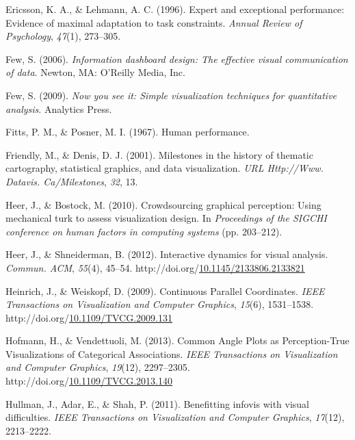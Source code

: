 \documentclass[print]{nuthesis}
\newlength{\cslhangindent}
\newenvironment{CSLReferences}[2]%
{\setlength{\parindent}{0pt}%
\everypar{\setlength{\hangindent}{\cslhangindent}}\ignorespaces}%
{\par}
\begin{document}
\begin{CSLReferences}{1}{0}
\leavevmode{}%
Ericsson, K. A., \& Lehmann, A. C. (1996). Expert and exceptional performance: Evidence of maximal adaptation to task constraints. \emph{Annual Review of Psychology}, \emph{47}(1), 273--305.

\leavevmode{}%
Few, S. (2006). \emph{Information dashboard design: The effective visual communication of data}. Newton, MA: O'Reilly Media, Inc.

\leavevmode{}%
Few, S. (2009). \emph{Now you see it: Simple visualization techniques for quantitative analysis}. Analytics Press.

\leavevmode{}%
Fitts, P. M., \& Posner, M. I. (1967). Human performance.

\leavevmode{}%
Friendly, M., \& Denis, D. J. (2001). Milestones in the history of thematic cartography, statistical graphics, and data visualization. \emph{URL Http://Www. Datavis. Ca/Milestones}, \emph{32}, 13.

\leavevmode{}%
Heer, J., \& Bostock, M. (2010). Crowdsourcing graphical perception: Using mechanical turk to assess visualization design. In \emph{Proceedings of the SIGCHI conference on human factors in computing systems} (pp. 203--212).

\leavevmode{}%
Heer, J., \& Shneiderman, B. (2012). Interactive dynamics for visual analysis. \emph{Commun. ACM}, \emph{55}(4), 45--54. http://doi.org/\href{https://doi.org/10.1145/2133806.2133821}{10.1145/2133806.2133821}

\leavevmode{}%
Heinrich, J., \& Weiskopf, D. (2009). {Continuous Parallel Coordinates}. \emph{IEEE Transactions on Visualization and Computer Graphics}, \emph{15}(6), 1531--1538. http://doi.org/\href{https://doi.org/10.1109/TVCG.2009.131}{10.1109/TVCG.2009.131}

\leavevmode{}%
Hofmann, H., \& Vendettuoli, M. (2013). {Common Angle Plots as Perception-True Visualizations of Categorical Associations}. \emph{IEEE Transactions on Visualization and Computer Graphics}, \emph{19}(12), 2297--2305. http://doi.org/\href{https://doi.org/10.1109/TVCG.2013.140}{10.1109/TVCG.2013.140}

\leavevmode{}%
Hullman, J., Adar, E., \& Shah, P. (2011). Benefitting infovis with visual difficulties. \emph{IEEE Transactions on Visualization and Computer Graphics}, \emph{17}(12), 2213--2222.


\end{CSLReferences}
\end{document}
